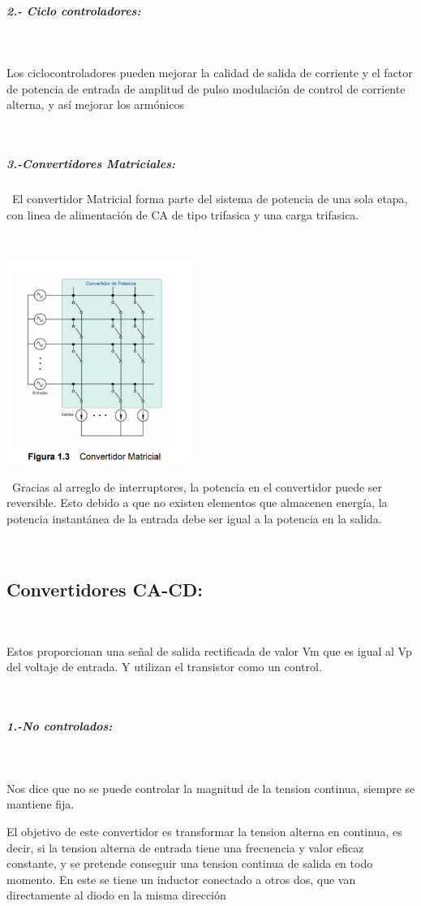 \documentclass[12pt,letterpaper]{article}
\begin{document}
\subparagraph{2.- Ciclo controladores:}

\

Los ciclocontroladores pueden mejorar la calidad de salida de corriente y el factor de potencia de entrada de amplitud de pulso modulación de control de corriente alterna, y así mejorar los armónicos 




\

\subparagraph{3.-Convertidores Matriciales:}
\
El convertidor Matricial forma parte del sistema de potencia de una sola etapa, con linea de alimentación de CA de tipo trifasica y una carga trifasica.

\

\includegraphics[width=6cm]{Convertidor matricial.png}
\

\
Gracias al arreglo de interruptores, la potencia en el convertidor puede ser reversible. Esto debido a que no existen elementos que almacenen energía, la potencia instantánea de la entrada debe ser igual a la potencia en la salida.
\

\

\subsection{Convertidores CA-CD:}
\

Estos proporcionan una señal de salida rectificada de valor Vm que es igual al Vp del voltaje de entrada. Y utilizan el transistor como un control.
\

\
\subparagraph{1.-No controlados:}
\

Nos dice que no se puede controlar la magnitud de la tension continua, siempre se mantiene fija. 
\

El objetivo de este convertidor es transformar la tension alterna en continua, es decir, si la tension alterna de entrada tiene una frecuencia y valor eficaz constante, y se pretende conseguir una tension continua de salida en todo momento.
En este se tiene un inductor conectado a otros dos, que van directamente al diodo en la misma dirección 
\end{document}
